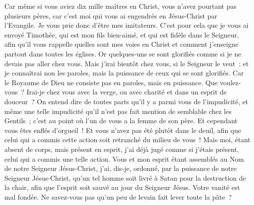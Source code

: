 \begin{multicols}{2}
Car même si vous aviez dix mille maîtres en Christ, vous n'avez pourtant pas plusieurs pères, car c'est moi qui vous ai engendrés en Jésus-Christ par l'Evangile.
Je vous prie donc d'être mes imitateurs.
C'est pour cela que je vous ai envoyé Timothée, qui est mon fils bien-aimé, et qui est fidèle dans le Seigneur, afin qu'il vous rappelle quelles sont mes voies en Christ et comment j'enseigne partout dans toutes les églises.
Or quelques-uns se sont glorifiés comme si je ne devais pas aller chez vous.
Mais j'irai bientôt chez vous, si le Seigneur le veut~; et je connaîtrai non les paroles, mais la puissance de ceux qui se sont glorifiés.
Car le Royaume de Dieu ne consiste pas en paroles, mais en puissance.
Que voulez-vous~? Irai-je chez vous avec la verge, ou avec charité et dans un esprit de douceur~?
\VerseOne{}On entend dire de toutes parts qu'il y a parmi vous de l'impudicité, et même une telle impudicité qu'il n'est pas fait mention de semblable chez les Gentils~; c'est au point où l'un de vous a la femme de son père.
Et cependant vous êtes enflés d'orgueil~! Et vous n'avez pas été plutôt dans le deuil, afin que celui qui a commis cette action soit retranché du milieu de vous~!
Mais moi, étant absent de corps, mais présent en esprit, j'ai déjà jugé comme si j'étais présent, celui qui a commis une telle action.
Vous et mon esprit étant assemblés au Nom de notre Seigneur Jésus-Christ, j'ai, dis-je, ordonné, par la puissance de notre Seigneur Jésus-Christ,
qu'un tel homme soit livré à Satan pour la destruction de la chair, afin que l'esprit soit sauvé au jour du Seigneur Jésus.
Votre vanité est mal fondée. Ne savez-vous pas qu'un peu de levain fait lever toute la pâte~?

\end{multicols}
